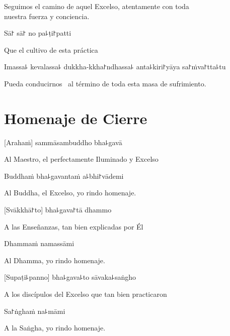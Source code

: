 \begin{english}
  Seguimos el camino de aquel Excelso, atentamente con toda\\ nuestra fuerza y conciencia.
\end{english}

Sā꜓ sā꜓ no pa꜕ṭi꜓patti

\begin{english}
  Que el cultivo de esta práctica
\end{english}

Imassa꜕ kevalassa꜕ dukkha-kkha꜓ndhassa꜕ anta꜕kiri꜓yāya sa꜓ṁva꜓tta꜕tu

\begin{english}
 Pueda conducirnos  \pause\  al término de toda esta masa de sufrimiento.
\end{english}

\clearpage

\chapter{Homenaje de Cierre}

[Arahaṁ] sammāsambuddho bha꜕gavā

\begin{english}
  Al Maestro, el perfectamente Iluminado y Excelso 
\end{english}

Buddhaṁ bha꜕gavantaṁ a꜕bhi꜓vādemi

\begin{english}
  Al Buddha, el Excelso, yo rindo homenaje.
\end{english}

[Svākkhā꜓to] bha꜕gava꜓tā dhammo

\begin{english}
  A las Enseñanzas, tan bien explicadas por Él 
\end{english}

Dhammaṁ namassāmi

\begin{english}
  Al Dhamma, yo rindo homenaje.
\end{english}


[Supaṭi꜕panno] bha꜕gava꜕to sāvaka꜕saṅgho

\begin{english}
  A los discípulos del Excelso que tan bien practicaron
\end{english}

Sa꜓ṅghaṁ na꜕māmi

\begin{english}
  A la Saṅgha, yo rindo homenaje.
\end{english}
